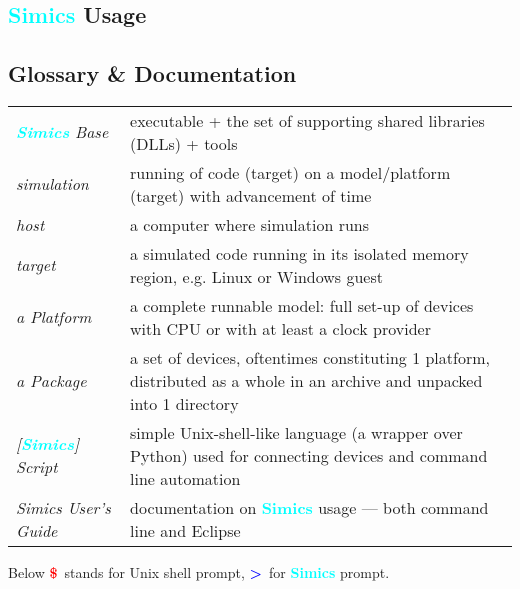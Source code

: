\documentclass[8pt]{extarticle}
\newcommand{\cod}[1]{\tcbox[
    size=fbox,
    on line,
    colback=green!15,
    colframe=black,
    arc=0.3em  %
]{#1}}
\newcommand{\prompt}{\textcolor{red}{\textbf{\$}\ }}
\newcommand{\sprompt}{\textcolor{blue}{\textbf{>}\ }}
\newcommand{\Simics}{\textcolor{cyan}{\textbf{Simics}}}
\newlength{\MyLen}
\begin{document}
\setlength\emergencystretch{\hsize}


\begin{multicols*}{3}

\section{\Simics{} Usage}

\subsection{Glossary \& Documentation}
    \begin{tabular}{p{\the\MyLen}p{\linewidth-\the\MyLen-0.8cm}}
        \textit{\Simics{} Base} & \cod{simics} executable + the set of
        supporting shared libraries (DLLs) + tools
        \\
        \textit{simulation}  & running of code (target) on
        a model/platform (target) with advancement of time
        \\
        \textit{host}        & a computer where simulation runs
        \\
        \textit{target}      & a simulated
        code running in its isolated memory region, e.g. Linux or
        Windows guest
        \\
        \textit{a Platform}  & a complete runnable model:
        full set-up of devices
        with CPU or with at least a clock provider
        \\
        \textit{a Package}   & a set of devices, oftentimes constituting
        1 platform, distributed as a whole in an archive and unpacked
        into 1 directory
        \\
        \textit{[\Simics] Script} & simple Unix-shell-like language (a wrapper
        over Python) used for connecting devices and command line 
        automation
        \\
        \textit{Simics User’s Guide} & documentation on \Simics{}
        usage — both command line and Eclipse
    \end{tabular}

    Below \prompt stands for Unix shell prompt, \sprompt for \Simics{} prompt.


\end{multicols*}
\end{document}
